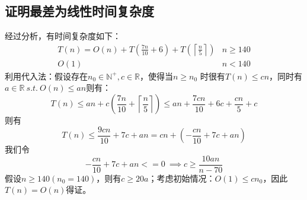 \documentclass{ctexart}[UTF8]
\begin{document}
    \subsection{证明最差为线性时间复杂度}
    经过分析，有时间复杂度如下：
    \begin{align}
        T(n) = 
            O(n) + T(\frac{7n}{10} + 6) + T( \left\lceil\frac{n}{5} \right\rceil) & n \ge 140\\
            O(1)&n< 140
    \end{align}
    利用代入法：假设存在$n_0\in \mathbb{N}^+,c\in \mathbb{R}$，使得当$n\ge n_0$ 时很有$T(n) \leq cn$，同时有$a\in \mathbb{R}\ s.t.\ O(n) \leq an$则有：
    \begin{equation}
        T(n) \leq an + c(\frac{7n}{10} + \left\lceil \frac{n}{5}\right\rceil ) \leq an + \frac{7cn}{10} + 6c + \frac{cn}{5} + c
    \end{equation}
    则有
    \begin{equation}
        T(n) \leq \frac{9cn}{10} + 7c + an = cn + (-\frac{cn}{10} + 7c + an)
    \end{equation}
    我们令
    \begin{equation}
        -\frac{cn}{10} + 7c + an <= 0\ \implies c\ge \frac{10an}{n-70}
    \end{equation}
    假设$n\ge 140(n_0 = 140)$，则有$c\ge 20a$；考虑初始情况：$O(1) \leq cn_0$，因此$T(n) = O(n)$得证。
\end{document}

